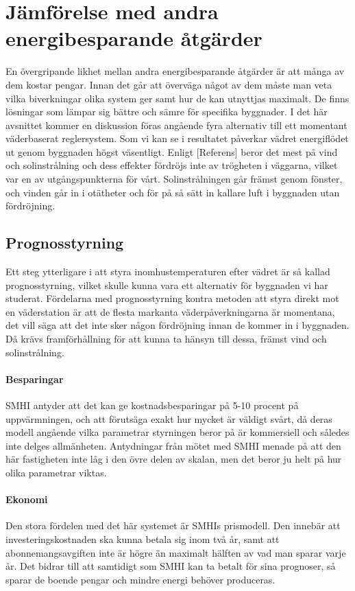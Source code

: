 \section{Jämförelse med andra energibesparande åtgärder}

En övergripande likhet mellan andra energibesparande åtgärder är att många av dem kostar pengar. Innan det går att överväga något av dem måste man veta vilka biverkningar olika system ger samt hur de kan utnyttjas maximalt. De finns lösningar som lämpar sig bättre och sämre för specifika byggnader. I det här avsnittet kommer en diskussion föras angående fyra alternativ till ett momentant väderbaserat reglersystem.
Som vi kan se i resultatet påverkar vädret energiflödet ut genom byggnaden högst väsentligt. Enligt [Referens] beror det mest på vind och solinstrålning och dess effekter fördröjs inte av trögheten i väggarna, vilket var en av utgångspunkterna för vårt. Solinstrålningen går främst genom fönster, och vinden går in i otätheter och för på så sätt in kallare luft i byggnaden utan fördröjning.

\subsection{Prognosstyrning}
Ett steg ytterligare i att styra inomhustemperaturen efter vädret är så kallad prognosstyrning, vilket skulle kunna vara ett alternativ för byggnaden vi har studerat.
Fördelarna med prognosstyrning kontra metoden att styra direkt mot en väderstation är att de flesta markanta väderpåverkningarna är momentana, det vill säga att det inte sker någon fördröjning innan de kommer in i byggnaden. Då krävs framförhållning för att kunna ta hänsyn till dessa, främst vind och solinstrålning.

\paragraph{Besparingar}
SMHI antyder att det kan ge kostnadsbesparingar på 5-10 procent på uppvärmningen, och att förutsäga exakt hur mycket är väldigt svårt, då deras modell angående vilka parametrar styrningen beror på är kommersiell och således inte delges allmänheten.  Antydningar från mötet med SMHI menade på att den här fastigheten inte låg i den övre delen av skalan, men det beror ju helt på hur olika parametrar viktas.

\paragraph{Ekonomi}
Den stora fördelen med det här systemet är SMHIs prismodell. Den innebär att investeringskostnaden ska kunna betala sig inom två år, samt att abonnemangsavgiften inte är högre än maximalt hälften av vad man sparar varje år. Det bidrar till att samtidigt som SMHI kan ta betalt för sina prognoser, så sparar de boende pengar och mindre energi behöver produceras.

